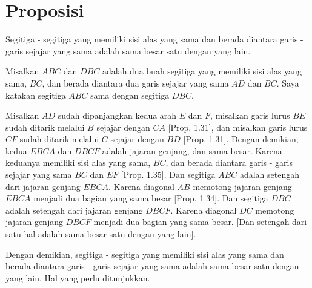 \documentclass[a4paper]{book}
\begin{document}
\section*{\centering Proposisi \thesection} 
Segitiga - segitiga yang memiliki sisi alas yang sama dan berada diantara
garis - garis sejajar yang sama adalah sama besar satu dengan yang lain.
\begin{center}
\end{center}
Misalkan $ABC$ dan $DBC$ adalah dua buah segitiga yang memiliki sisi alas yang
sama, $BC$, dan berada diantara dua garis sejajar yang sama $AD$ dan $BC$.
Saya katakan segitiga $ABC$ sama dengan segitiga $DBC$.

Misalkan $AD$ sudah dipanjangkan kedua arah $E$ dan $F$, misalkan garis lurus
$BE$ sudah ditarik melalui $B$ sejajar dengan $CA$ [Prop. 1.31], dan 
misalkan garis lurus $CF$ sudah ditarik melalui $C$ sejajar dengan $BD$ 
[Prop. 1.31]. Dengan demikian, kedua  $EBCA$ dan $DBCF$ adalah jajaran genjang, 
dan sama besar. Karena keduanya memiliki sisi alas yang sama, $BC$, dan berada
diantara garis - garis sejajar yang sama $BC$ dan $EF$ [Prop. 1.35]. Dan
segitiga $ABC$ adalah setengah dari jajaran genjang $EBCA$. Karena
diagonal $AB$ memotong jajaran genjang $EBCA$ menjadi dua bagian yang sama 
besar [Prop. 1.34]. Dan segitiga $DBC$ adalah setengah dari jajaran genjang 
$DBCF$.
Karena diagonal $DC$ memotong jajaran genjang $DBCF$ menjadi dua bagian yang 
sama besar. [Dan setengah dari satu hal adalah sama besar satu dengan 
yang lain].

Dengan demikian, segitiga - segitiga yang memiliki sisi alas yang sama dan 
berada diantara garis - garis sejajar yang sama adalah sama besar satu dengan 
yang lain. Hal yang perlu ditunjukkan.

\end{document}
